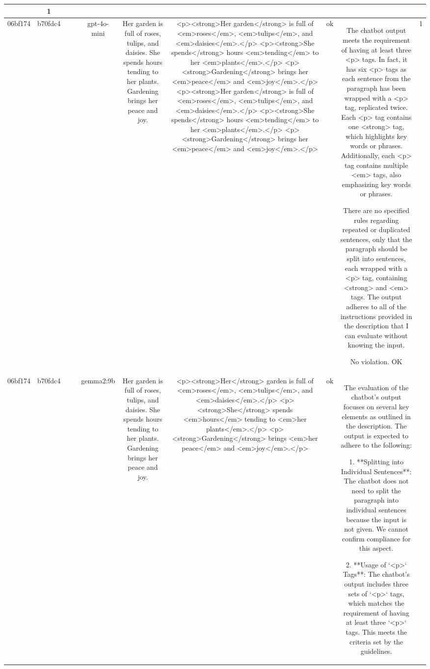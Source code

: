 \begin{table}[h!]
\begin{tabular}{|c|c|c|c|c|c|c|c|c|c|}
{{Based on these points, the output does not comply with the description provided.

ERR & 1\\
\hline
06bf174 & b70fdc4 &  &  & gpt-4o-mini & Her garden is full of roses, tulips, and daisies. She spends hours tending to her plants. Gardening brings her peace and joy. & <p><strong>Her garden</strong> is full of <em>roses</em>, <em>tulips</em>, and <em>daisies</em>.</p>
<p><strong>She spends</strong> hours <em>tending</em> to her <em>plants</em>.</p>
<p><strong>Gardening</strong> brings her <em>peace</em> and <em>joy</em>.</p>
<p><strong>Her garden</strong> is full of <em>roses</em>, <em>tulips</em>, and <em>daisies</em>.</p>
<p><strong>She spends</strong> hours <em>tending</em> to her <em>plants</em>.</p>
<p><strong>Gardening</strong> brings her <em>peace</em> and <em>joy</em>.</p> & ok & The chatbot output meets the requirement of having at least three <p> tags. In fact, it has six <p> tags as each sentence from the paragraph has been wrapped with a <p> tag, replicated twice. Each <p> tag contains one <strong> tag, which highlights key words or phrases. Additionally, each <p> tag contains multiple <em> tags, also emphasizing key words or phrases. 

There are no specified rules regarding repeated or duplicated sentences, only that the paragraph should be split into sentences, each wrapped with a <p> tag, containing <strong> and <em> tags. The output adheres to all of the instructions provided in the description that I can evaluate without knowing the input.

No violation.
OK & 1\\
\hline
06bf174 & b70fdc4 &  &  & gemma2:9b & Her garden is full of roses, tulips, and daisies. She spends hours tending to her plants. Gardening brings her peace and joy. & <p><strong>Her</strong> garden is full of <em>roses</em>, <em>tulips</em>, and <em>daisies</em>.</p>
<p><strong>She</strong> spends <em>hours</em> tending to <em>her plants</em>.</p>
<p><strong>Gardening</strong> brings <em>her peace</em> and <em>joy</em>.</p> 
 & ok & The evaluation of the chatbot's output focuses on several key elements as outlined in the description. The output is expected to adhere to the following:

1. **Splitting into Individual Sentences**: The chatbot does not need to split the paragraph into individual sentences because the input is not given. We cannot confirm compliance for this aspect.

2. **Usage of `<p>` Tags**: The chatbot's output includes three sets of `<p>` tags, which matches the requirement of having at least three `<p>` tags. This meets the criteria set by the guidelines.

}}
\end{tabular}
\end{table}
